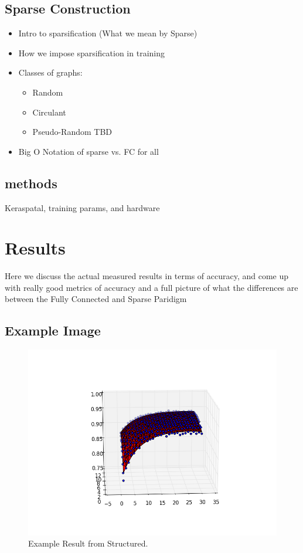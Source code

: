 \documentclass{article}
\begin{document}
\subsection{Sparse Construction}
\begin{itemize}
\item Intro to sparsification (What we mean by Sparse)
\item How we impose sparsification in training
\item Classes of graphs:
\begin{itemize}
\item Random
\item Circulant
\item Pseudo-Random TBD
\end{itemize}
\item Big O Notation of sparse vs. FC for all
\end{itemize}
\subsection{methods}
Keraspatal, training params, and hardware


\section{Results}

Here we discuss the actual measured results in terms of accuracy, and come up with really good metrics of accuracy and a full picture of what the differences are between the Fully Connected and Sparse Paridigm

\subsection{Example Image}
\begin{figure}[ht]
\vskip 0.2in
\begin{center}
\centerline{\includegraphics[width=\columnwidth]{../Images/example_result.png}}
\caption{Example Result from Structured.}
\label{icml-historical}
\end{center}
\vskip -0.2in
\end{figure} 
\end{document}
